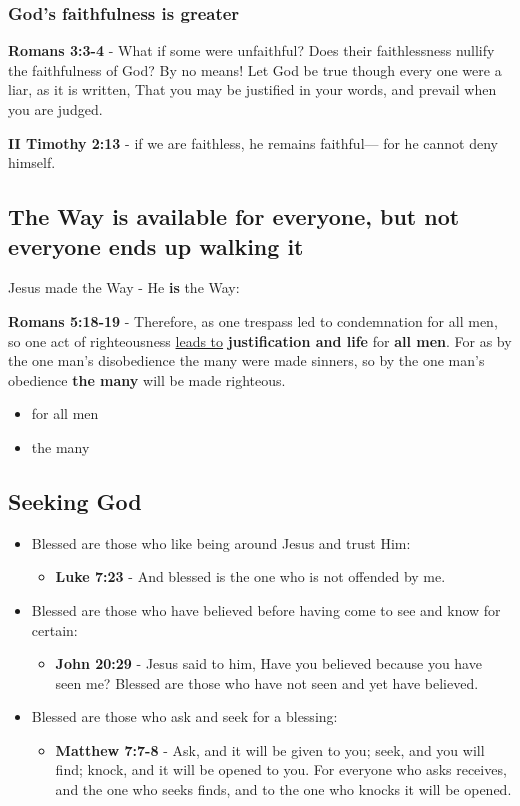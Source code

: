 \documentclass[11pt]{article}
\begin{document}
\subsubsection{God's faithfulness is greater}
\label{sec:org8fb1ad6}
\textbf{Romans 3:3-4} - What if some were unfaithful? Does their faithlessness nullify the faithfulness of God? By no means! Let God be true though every one were a liar, as it is written, That you may be justified in your words, and prevail when you are judged.

\textbf{II Timothy 2:13} - if we are faithless, he remains faithful— for he cannot deny himself.

\subsection{The Way is available for everyone, but not everyone ends up walking it}
\label{sec:org5597ce0}
Jesus made the Way - He \textbf{is} the Way:

\textbf{Romans 5:18-19} - Therefore, as one trespass led to condemnation for all men, so one act of righteousness \uline{leads to} \textbf{justification and life} for \textbf{all men}. For as by the one man's disobedience the many were made sinners, so by the one man's obedience \textbf{the many} will be made righteous.

\begin{itemize}
\item for all men
\item the many
\end{itemize}

\subsection{Seeking God}
\label{sec:org606a4be}
\begin{itemize}
\item Blessed are those who like being around Jesus and trust Him:
\begin{itemize}
\item \textbf{Luke 7:23} - And blessed is the one who is not offended by me.
\end{itemize}

\item Blessed are those who have believed before having come to see and know for certain:
\begin{itemize}
\item \textbf{John 20:29} - Jesus said to him, Have you believed because you have seen me? Blessed are those who have not seen and yet have believed.􇩙
\end{itemize}

\item Blessed are those who ask and seek for a blessing:
\begin{itemize}
\item \textbf{Matthew 7:7-8} - Ask, and it will be given to you; seek, and you will find; knock, and it will be opened to you. For everyone who asks receives, and the one who seeks finds, and to the one who knocks it will be opened.
\end{itemize}
\end{itemize}
\end{document}
